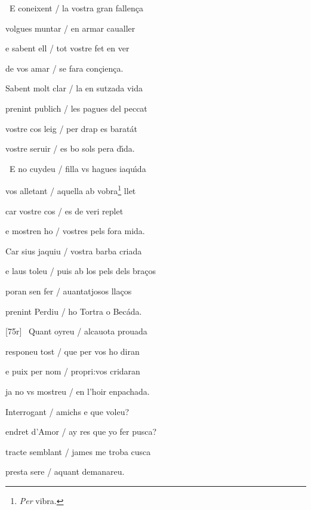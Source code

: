 \documentclass[12pt]{article}
\begin{document}
\begin{estrofa}

 \textparagraph\  E coneixent / la vostra gran fallen\c{c}a

 volgues muntar / en armar caualler

 e sabent ell / tot vostre fet en ver

 de vos amar / se fara con\c{c}ien\c{c}a.

 Sabent molt clar / la en sutzada vida

 prenint publich / les pagues del peccat

 vostre cos leig / per drap es barat\'{a}t

 vostre seruir / es bo sols pera d\'{\i}da.

\end{estrofa}



\begin{estrofa}

 \textparagraph\  E no cuydeu / filla vs hagues iaqu\'{\i}da

 vos alletant / aquella ab vobra\footnote{\textit{Per }vibra.} llet

 car vostre cos / es de veri replet

 e mostren ho / vostres pels fora mida.

 Car sius jaquiu / vostra barba criada

 e laus toleu / puis ab los pels dels bra\c{c}os

 poran sen fer / auantatjosos lla\c{c}os

 prenint Perdiu / ho Tortra o Bec\'{a}da.

\end{estrofa}



\begin{estrofa}

 [75r] \textparagraph\  Quant oyreu / alcauota prouada

 responeu tost / que per vos ho diran

 e puix per nom / propri:vos cridaran

 ja no vs mostreu / en l'hoir enpachada.

 Interrogant / amichs e que voleu?

 endret d'Amor / ay res que yo fer pusca?

 tracte semblant / james me troba cusca

 presta sere / aquant demanareu.

\end{estrofa}
\end{document}
